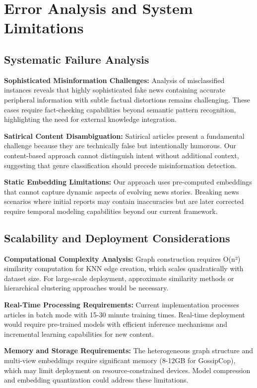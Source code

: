 \section{Error Analysis and System Limitations}

\subsection{Systematic Failure Analysis}

\textbf{Sophisticated Misinformation Challenges:} Analysis of misclassified instances reveals that highly sophisticated fake news containing accurate peripheral information with subtle factual distortions remains challenging. These cases require fact-checking capabilities beyond semantic pattern recognition, highlighting the need for external knowledge integration.

\textbf{Satirical Content Disambiguation:} Satirical articles present a fundamental challenge because they are technically false but intentionally humorous. Our content-based approach cannot distinguish intent without additional context, suggesting that genre classification should precede misinformation detection.

\textbf{Static Embedding Limitations:} Our approach uses pre-computed embeddings that cannot capture dynamic aspects of evolving news stories. Breaking news scenarios where initial reports may contain inaccuracies but are later corrected require temporal modeling capabilities beyond our current framework.

\subsection{Scalability and Deployment Considerations}

\textbf{Computational Complexity Analysis:} Graph construction requires O(n²) similarity computation for KNN edge creation, which scales quadratically with dataset size. For large-scale deployment, approximate similarity methods or hierarchical clustering approaches would be necessary.

\textbf{Real-Time Processing Requirements:} Current implementation processes articles in batch mode with 15-30 minute training times. Real-time deployment would require pre-trained models with efficient inference mechanisms and incremental learning capabilities for new content.

\textbf{Memory and Storage Requirements:} The heterogeneous graph structure and multi-view embeddings require significant memory (8-12GB for GossipCop), which may limit deployment on resource-constrained devices. Model compression and embedding quantization could address these limitations.

\EndChapter
